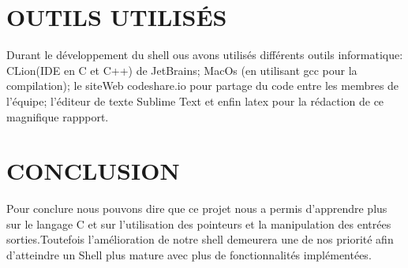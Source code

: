 \documentclass[12pt]{article}
\begin{document}
\section{OUTILS UTILISÉS}\vspace{0,5cm}
Durant le développement du shell ous avons utilisés différents outils informatique: CLion(IDE en C et C++) de JetBrains; MacOs (en utilisant gcc pour la compilation); le siteWeb codeshare.io pour partage du code entre les membres de l'équipe; l'éditeur de texte Sublime Text et enfin latex pour la rédaction de ce magnifique rappport.\vspace{0,3cm}

\section{CONCLUSION}\vspace{0,5cm}
Pour conclure nous pouvons dire que ce projet nous a permis d'apprendre plus sur le langage C et sur l'utilisation des pointeurs et la manipulation des entrées sorties.Toutefois l'amélioration de notre shell demeurera une de nos priorité afin d'atteindre un Shell plus mature avec plus de fonctionnalités implémentées.
\end{document}

